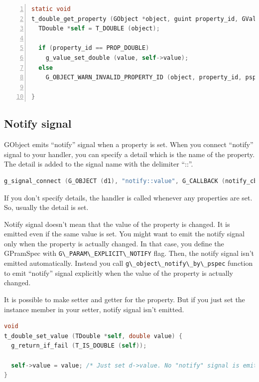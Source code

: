 \begin{lstlisting}[language=C, numbers=left]
static void
t_double_get_property (GObject *object, guint property_id, GValue *value, GParamSpec *pspec) {
  TDouble *self = T_DOUBLE (object);

  if (property_id == PROP_DOUBLE)
    g_value_set_double (value, self->value);
  else
    G_OBJECT_WARN_INVALID_PROPERTY_ID (object, property_id, pspec);

}
\end{lstlisting}

\subsection{Notify signal}\label{notify-signal}

GObject emits ``notify'' signal when a property is set. When you connect
``notify'' signal to your handler, you can specify a detail which is the
name of the property. The detail is added to the signal name with the
delimiter ``::''.

\begin{lstlisting}[language=C]
g_signal_connect (G_OBJECT (d1), "notify::value", G_CALLBACK (notify_cb), NULL);
\end{lstlisting}

If you don't specify details, the handler is called whenever any
properties are set. So, usually the detail is set.

Notify signal doesn't mean that the value of the property is changed. It
is emitted even if the same value is set. You might want to emit the
notify signal only when the property is actually changed. In that case,
you define the GPramSpec with
\passthrough{\lstinline!G\_PARAM\_EXPLICIT\_NOTIFY!} flag. Then, the
notify signal isn't emitted automatically. Instead you call
\passthrough{\lstinline!g\_object\_notify\_by\_pspec!} function to emit
``notify'' signal explicitly when the value of the property is actually
changed.

It is possible to make setter and getter for the property. But if you
just set the instance member in your setter, notify signal isn't
emitted.

\begin{lstlisting}[language=C]
void
t_double_set_value (TDouble *self, double value) {
  g_return_if_fail (T_IS_DOUBLE (self));

  self->value = value; /* Just set d->value. No "notify" signal is emitted. */
}
\end{lstlisting}

